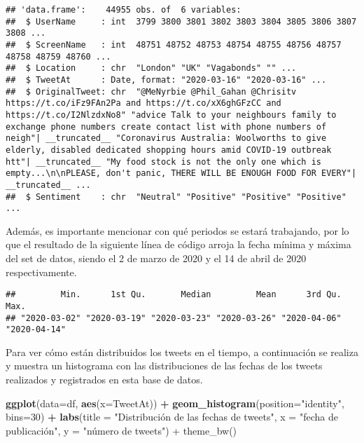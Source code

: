 \documentclass[
]{article}
\newenvironment{Shaded}{\begin{snugshade}}{\end{snugshade}}
\newcommand{\DataTypeTok}[1]{\textcolor[rgb]{0.13,0.29,0.53}{#1}}
\newcommand{\DecValTok}[1]{\textcolor[rgb]{0.00,0.00,0.81}{#1}}
\newcommand{\KeywordTok}[1]{\textcolor[rgb]{0.13,0.29,0.53}{\textbf{#1}}}
\newcommand{\NormalTok}[1]{#1}
\newcommand{\OperatorTok}[1]{\textcolor[rgb]{0.81,0.36,0.00}{\textbf{#1}}}
\newcommand{\StringTok}[1]{\textcolor[rgb]{0.31,0.60,0.02}{#1}}
\begin{document}
\begin{verbatim}
## 'data.frame':    44955 obs. of  6 variables:
##  $ UserName     : int  3799 3800 3801 3802 3803 3804 3805 3806 3807 3808 ...
##  $ ScreenName   : int  48751 48752 48753 48754 48755 48756 48757 48758 48759 48760 ...
##  $ Location     : chr  "London" "UK" "Vagabonds" "" ...
##  $ TweetAt      : Date, format: "2020-03-16" "2020-03-16" ...
##  $ OriginalTweet: chr  "@MeNyrbie @Phil_Gahan @Chrisitv https://t.co/iFz9FAn2Pa and https://t.co/xX6ghGFzCC and https://t.co/I2NlzdxNo8" "advice Talk to your neighbours family to exchange phone numbers create contact list with phone numbers of neigh"| __truncated__ "Coronavirus Australia: Woolworths to give elderly, disabled dedicated shopping hours amid COVID-19 outbreak htt"| __truncated__ "My food stock is not the only one which is empty...\n\nPLEASE, don't panic, THERE WILL BE ENOUGH FOOD FOR EVERY"| __truncated__ ...
##  $ Sentiment    : chr  "Neutral" "Positive" "Positive" "Positive" ...
\end{verbatim}

Además, es importante mencionar con qué periodos se estará trabajando,
por lo que el resultado de la siguiente línea de código arroja la fecha
mínima y máxima del set de datos, siendo el 2 de marzo de 2020 y el 14
de abril de 2020 respectivamente.

\begin{Shaded}
\end{Shaded}

\begin{verbatim}
##         Min.      1st Qu.       Median         Mean      3rd Qu.         Max. 
## "2020-03-02" "2020-03-19" "2020-03-23" "2020-03-26" "2020-04-06" "2020-04-14"
\end{verbatim}

Para ver cómo están distribuidos los tweets en el tiempo, a continuación
se realiza y muestra un histograma con las distribuciones de las fechas
de los tweets realizados y registrados en esta base de datos.

\begin{Shaded}
\begin{Highlighting}[]
\KeywordTok{ggplot}\NormalTok{(}\DataTypeTok{data=}\NormalTok{df, }\KeywordTok{aes}\NormalTok{(}\DataTypeTok{x=}\NormalTok{TweetAt)) }\OperatorTok{+}\StringTok{ }\KeywordTok{geom_histogram}\NormalTok{(}\DataTypeTok{position=}\StringTok{"identity"}\NormalTok{, }\DataTypeTok{bins=}\DecValTok{30}\NormalTok{) }\OperatorTok{+}
\StringTok{  }\KeywordTok{labs}\NormalTok{(}\DataTypeTok{title =} \StringTok{"Distribución de las fechas de tweets"}\NormalTok{, }\DataTypeTok{x =} \StringTok{"fecha de publicación",}
\StringTok{       y = "}\NormalTok{número de tweets}\StringTok{") + theme_bw()}
\end{Highlighting}
\end{Shaded}
\end{document}
